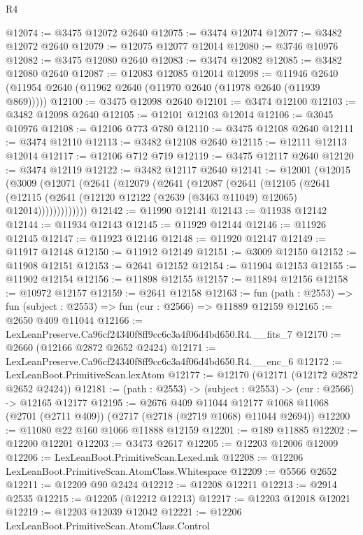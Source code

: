 \begin{lexlean}{R4}
\begin{coremodule}
@12074 := @3475 @12072 @2640
@12075 := @3474 @12074
@12077 := @3482 @12072 @2640
@12079 := @12075 @12077 @12014
@12080 := @3746 @10976
@12082 := @3475 @12080 @2640
@12083 := @3474 @12082
@12085 := @3482 @12080 @2640
@12087 := @12083 @12085 @12014
@12098 := @11946 @2640 (@11954 @2640 (@11962 @2640 (@11970 @2640 (@11978 @2640 (@11939 @869)))))
@12100 := @3475 @12098 @2640
@12101 := @3474 @12100
@12103 := @3482 @12098 @2640
@12105 := @12101 @12103 @12014
@12106 := @3045 @10976
@12108 := @12106 @773 @780
@12110 := @3475 @12108 @2640
@12111 := @3474 @12110
@12113 := @3482 @12108 @2640
@12115 := @12111 @12113 @12014
@12117 := @12106 @712 @719
@12119 := @3475 @12117 @2640
@12120 := @3474 @12119
@12122 := @3482 @12117 @2640
@12141 := @12001
    (@12015
      (@3009
        (@12071
          (@2641
            (@12079
              (@2641
                (@12087
                  (@2641
                    (@12105
                      (@2641
                        (@12115
                          (@2641 (@12120 @12122 (@2639 (@3463 @11049) @12065) @12014)))))))))))))
@12142 := @11990 @12141
@12143 := @11938 @12142
@12144 := @11934 @12143
@12145 := @11929 @12144
@12146 := @11926 @12145
@12147 := @11923 @12146
@12148 := @11920 @12147
@12149 := @11917 @12148
@12150 := @11912 @12149
@12151 := @3009 @12150
@12152 := @11908 @12151
@12153 := @2641 @12152
@12154 := @11904 @12153
@12155 := @11902 @12154
@12156 := @11898 @12155
@12157 := @11894 @12156
@12158 := @10972 @12157
@12159 := @2641 @12158
@12163 := fun (path : @2553) => fun (subject : @2553) => fun (cur : @2566) => @11889 @12159
@12165 := @2650 @409 @11044
@12166 := LexLeanPreserve.Ca96cf24340f8ff9cc6c3a4f06d4bd650.R4.__fits_7
@12170 := @2660 (@12166 @2872 @2652 @2424)
@12171 := LexLeanPreserve.Ca96cf24340f8ff9cc6c3a4f06d4bd650.R4.__enc_6
@12172 := LexLeanBoot.PrimitiveScan.lexAtom
@12177 := @12170 (@12171 (@12172 @2872 @2652 @2424))
@12181 := (path : @2553) -> (subject : @2553) -> (cur : @2566) -> @12165 @12177
@12195 := @2676
    @409
    @11044
    @12177
    @1068
    @11068
    (@2701 (@2711 @409))
    (@2717 (@2718 (@2719 @1068) @11044 @2694))
@12200 := @11080 @22 @160 @1066 @11888 @12159
@12201 := @189 @11885
@12202 := @12200 @12201
@12203 := @3473 @2617
@12205 := @12203 @12006 @12009
@12206 := LexLeanBoot.PrimitiveScan.Lexed.mk
@12208 := @12206 LexLeanBoot.PrimitiveScan.AtomClass.Whitespace
@12209 := @5566 @2652
@12211 := @12209 @90 @2424
@12212 := @12208 @12211
@12213 := @2914 @2535
@12215 := @12205 (@12212 @12213)
@12217 := @12203 @12018 @12021
@12219 := @12203 @12039 @12042
@12221 := @12206 LexLeanBoot.PrimitiveScan.AtomClass.Control

\end{coremodule}
\end{lexlean}
